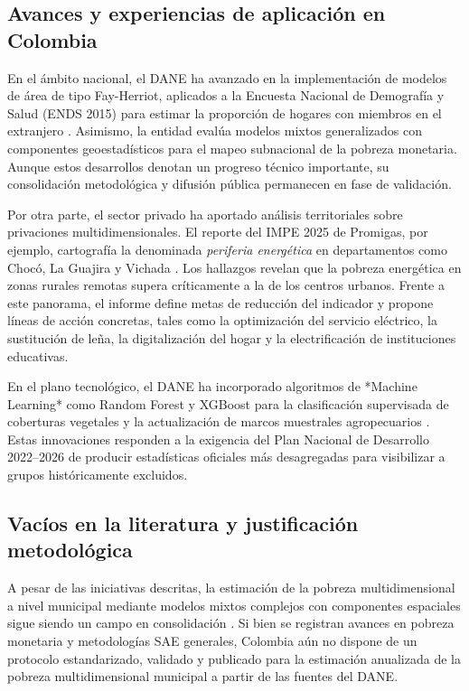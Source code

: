 \subsection{Avances y experiencias de aplicación en Colombia}

En el ámbito nacional, el DANE ha avanzado en la implementación de modelos de área de tipo Fay-Herriot, aplicados a la Encuesta Nacional de Demografía y Salud (ENDS 2015) para estimar la proporción de hogares con miembros en el extranjero \cite{dane2024}. Asimismo, la entidad evalúa modelos mixtos generalizados con componentes geoestadísticos para el mapeo subnacional de la pobreza monetaria. Aunque estos desarrollos denotan un progreso técnico importante, su consolidación metodológica y difusión pública permanecen en fase de validación.

Por otra parte, el sector privado ha aportado análisis territoriales sobre privaciones multidimensionales. El reporte del IMPE 2025 de Promigas, por ejemplo, cartografía la denominada \textit{periferia energética} en departamentos como Chocó, La Guajira y Vichada \cite{promigas2025}. Los hallazgos revelan que la pobreza energética en zonas rurales remotas supera críticamente a la de los centros urbanos. Frente a este panorama, el informe define metas de reducción del indicador y propone líneas de acción concretas, tales como la optimización del servicio eléctrico, la sustitución de leña, la digitalización del hogar y la electrificación de instituciones educativas.

En el plano tecnológico, el DANE ha incorporado algoritmos de *Machine Learning* como Random Forest y XGBoost para la clasificación supervisada de coberturas vegetales y la actualización de marcos muestrales agropecuarios \cite{dane2024}. Estas innovaciones responden a la exigencia del Plan Nacional de Desarrollo 2022--2026 de producir estadísticas oficiales más desagregadas para visibilizar a grupos históricamente excluidos.

\subsection{Vacíos en la literatura y justificación metodológica}

A pesar de las iniciativas descritas, la estimación de la pobreza multidimensional a nivel municipal mediante modelos mixtos complejos con componentes espaciales sigue siendo un campo en consolidación \cite{dane2024}. Si bien se registran avances en pobreza monetaria y metodologías SAE generales, Colombia aún no dispone de un protocolo estandarizado, validado y publicado para la estimación anualizada de la pobreza multidimensional municipal a partir de las fuentes del DANE.

